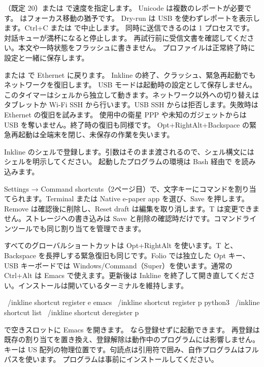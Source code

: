 （既定 20）または  で速度を指定します。
Unicode は複数のレポートが必要です。 はフォーカス移動の猶予です。
Dry-run は USB を使わずレポートを表示します。Ctrl+C または  で中止します。
同時に送信できるのは 1 プロセスです。対話キューが満杯になると停止します。
再試行前に受信文書を確認してください。本文や一時状態をフラッシュに書きません。
プロファイルは正常終了時に設定と一緒に保存します。

 または  で Ethernet に戻ります。
Inkline の終了、クラッシュ、緊急再起動でもネットワークを復旧します。
USB モードは起動時の設定として保存しません。
\UsbRecoveryExample
このタイマーはシェルから独立して動きます。ネットワーク以外への切り替えはタブレットか
Wi-Fi SSH から行います。USB SSH からは拒否します。失敗時は Ethernet の復旧を試みます。
使用中の衛星 PPP や未知のガジェットからは USB を奪いません。終了時の復旧も同様です。
Opt+RightAlt+Backspace の緊急再起動は全端末を閉じ、未保存の作業を失います。

Inkline のシェルで登録します。引数はそのまま渡されるので、シェル構文にはシェルを明示してください。
起動したプログラムの環境は Bash 経由で  を読み込みます。

Settings → Command shortcuts（2ページ目）で、文字キーにコマンドを割り当てられます。Terminal または Native e-paper app を選び、Save を押します。Remove は確認後に削除し、Reset draft は編集を取り消します。T は変更できません。ストレージへの書き込みは Save と削除の確認時だけです。コマンドラインツールでも同じ割り当てを管理できます。

すべてのグローバルショートカットは Opt+RightAlt を使います。T と、Backspace を長押しする緊急復旧も同じです。Folio では独立した Opt キー、USB キーボードでは Windows/Command（Super）を使います。通常の Ctrl+Alt は Emacs で使えます。更新後は Inkline を終了して開き直してください。インストールは開いているターミナルを維持します。

\begin{shell}
~/inkline shortcut register e emacs
~/inkline shortcut register p python3
~/inkline shortcut list
~/inkline shortcut deregister p
\end{shell}

 で空きスロットに Emacs を開きます。
 なら登録せずに起動できます。
再登録は既存の割り当てを置き換え、登録解除は動作中のプログラムには影響しません。
キーは US 配列の物理位置です。句読点は引用符で囲み、自作プログラムはフルパスを使います。
プログラムは事前にインストールしてください。

